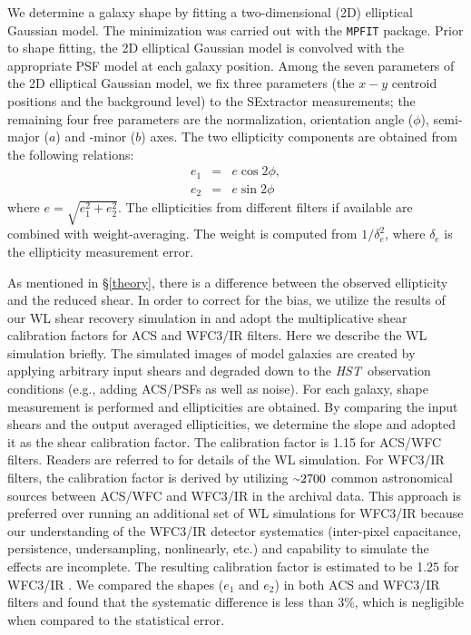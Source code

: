 \documentclass[twocolumn]{aastex631}
\newcommand{\HST}{{\it HST}}
\newcommand{\mytilde}{\raise.19ex\hbox{$\scriptstyle\sim$}}
\begin{document}
We determine a galaxy shape by fitting a two-dimensional (2D) elliptical Gaussian model. 
The minimization was carried out with the {\tt MPFIT} \citep{MPFIT} package. 
Prior to shape fitting, the 2D elliptical Gaussian model is convolved with the appropriate PSF model at each galaxy position. 
Among the seven parameters of the 2D elliptical Gaussian model, we fix three parameters (the $x-y$ centroid positions and the background level) to the SExtractor measurements; the remaining four free parameters are the normalization, orientation angle ($\phi$), semi-major ($a$) and -minor ($b$) axes. 
The two ellipticity components are obtained from the following relations:
\begin{eqnarray}
e_1&=&e \cos{2 \phi}, \\
e_2&=&e \sin{2 \phi} \label{e1e2}
\end{eqnarray}
\noindent
where $e = \sqrt{e_1^2 + e_2^2}$. 
The ellipticities from different filters if available are combined with weight-averaging. 
The weight is computed from $1/ \delta_e^{2}$, where $\delta_e$ is the ellipticity measurement error.


As mentioned in \S\ref{theory}, there is a difference between the observed ellipticity and the reduced shear. 
In order to correct for the bias, we utilize the results of our WL shear recovery simulation in \cite{Jee2013} and adopt the multiplicative shear calibration factors for ACS and WFC3/IR filters. 
Here we describe the WL simulation briefly. The simulated images of model galaxies are created by applying arbitrary input shears and degraded down to the \HST~observation conditions (e.g., adding ACS/PSFs as well as noise). 
For each galaxy, shape measurement is performed and ellipticities are obtained. 
By comparing the input shears and the output averaged ellipticities, we determine the slope and adopted it as the shear calibration factor. 
The calibration factor is 1.15 for ACS/WFC filters. Readers are referred to \cite{Jee2013} for details of the WL simulation. 
For WFC3/IR filters, the calibration factor is derived by utilizing $\mytilde2700$ common astronomical sources between ACS/WFC and WFC3/IR in the archival data. 
This approach is preferred over running an additional set of WL simulations for WFC3/IR because our understanding of the WFC3/IR detector systematics (inter-pixel capacitance, persistence, undersampling, nonlinearly, etc.) and capability to simulate the effects are incomplete. 
The resulting calibration factor is estimated to be 1.25 for WFC3/IR \citep{Jee2017}. 
We compared the shapes ($e_1$ and $e_2$) in both ACS and WFC3/IR filters and found that the systematic difference is less than $3$\%, which is negligible when compared to the statistical error.
\end{document}
